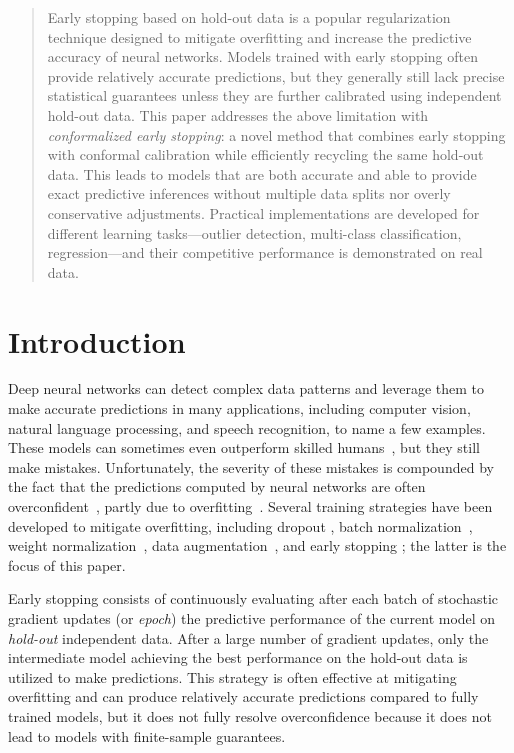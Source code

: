 \begin{abstract}
Early stopping based on hold-out data is a popular regularization technique designed to mitigate overfitting and increase the predictive accuracy of neural networks. Models trained with early stopping often provide relatively accurate predictions, but they generally still lack precise statistical guarantees unless they are further calibrated using independent hold-out data. This paper addresses the above limitation with {\em conformalized early stopping}: a novel method that combines early stopping with conformal calibration while efficiently recycling the same hold-out data. This leads to models that are both accurate and able to provide exact predictive inferences without multiple data splits nor overly conservative adjustments. Practical implementations are developed for different learning tasks---outlier detection, multi-class classification, regression---and their competitive performance is demonstrated on real data.
\end{abstract}


\section{Introduction}

Deep neural networks can detect complex data patterns and leverage them to make accurate predictions in many applications, including computer vision, natural language processing, and speech recognition, to name a few examples.
These models can sometimes even outperform skilled humans~\citep{silver2016mastering}, but they still make mistakes.
Unfortunately, the severity of these mistakes is compounded by the fact that the predictions computed by neural networks are often overconfident~\citep{guo2017calibration}, partly due to overfitting~\citep{thulasidasan2019mixup,ovadia2019can}.
Several training strategies have been developed to mitigate overfitting, including dropout \citep{srivastava2014dropout}, batch normalization~\citep{ioffe2015batch}, weight normalization~\citep{salimans2016weight}, data augmentation~\citep{shorten2019survey}, and early stopping \citep{PRECHELT1997}; the latter is the focus of this paper.

Early stopping consists of continuously evaluating after each batch of stochastic gradient updates (or {\em epoch}) the predictive performance of the current model on {\em hold-out} independent data.
After a large number of gradient updates, only the intermediate model achieving the best performance on the hold-out data is utilized to make predictions.
This strategy is often effective at mitigating overfitting and can produce relatively accurate predictions compared to fully trained models, but it does not fully resolve overconfidence because it does not lead to models with finite-sample guarantees.

